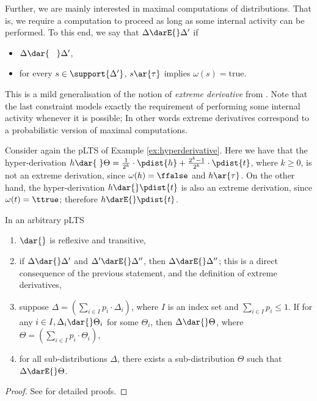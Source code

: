 \documentclass{LMCS}
\begin{document}
Further, we are mainly interested in maximal computations of distributions. That is, we require a computation 
to proceed as long as some internal activity can be performed.
To this end, we  say that $\Delta\darE{} \Delta'$ if
\begin{itemize}
\item $\Delta \dar{\;\;\;} \Delta'$,
\item for every  
$s \in \support{\Delta'}$, $s \ar{\tau} $ implies $\omega(s) = \mbox{true}$. 
\end{itemize}
\noindent
This is a mild generalisation of the notion of \emph{extreme derivative} from \cite{DGHM09full}.
Note that the last constraint models exactly the requirement of performing some internal activity 
whenever it is possible;  In other words extreme derivatives correspond to a probabilistic
version of maximal computations.

\begin{exa}
Consider again the pLTS of Example \ref{ex:hyperderivative}. Here we have that 
the hyper-derivation $h \dar{\;} \Theta = \frac{1}{2^k} \cdot \pdist{h} + \frac{2^{k}-1}{2^k} 
 \cdot \pdist{t}$, where $k \geq 0$, is not an extreme derivation, since $\omega(h) = \ffalse$ and $h \ar{\tau}$. 
On the other hand, the hyper-derivation $h \dar{} \pdist{t}$ is also an extreme derivation, 
since $\omega(t) =\ttrue$; therefore $h \darE{} \pdist{t}$.
\end{exa}

\begin{thm}\label{thm:hyper}
  In an arbitrary pLTS
  \begin{enumerate}[label=(\roman*)]
  \item $\dar{}$ is reflexive and transitive,
  \item if $\Delta \dar{} \Delta'$ and $\Delta' \darE{} \Delta''$, then $\Delta \darE{} \Delta''$; 
   this is a direct consequence of the previous statement, and the definition of extreme derivatives,
  \item suppose $\Delta = \left(\sum_{i \in I} p_i \cdot \Delta_i\right)$, where $I$ is an index set and 
  $\sum_{i \in I} p_i \leq 1$. If for any 
  $i \in I, \Delta_i \dar{} \Theta_i$ for some $\Theta_i$, then $\Delta \dar{}\Theta$, where 
  $\Theta = \left(\sum_{i \in I} p_i \cdot \Theta_i\right)$,
  \item for all sub-distributions $\Delta$, there exists a sub-distribution $\Theta$ such that 
   $\Delta \darE{} \Theta$.
  \end{enumerate}
\end{thm}
\begin{proof}
  See \cite{DGHM09full} for detailed proofs. 
\end{proof}
\end{document}
